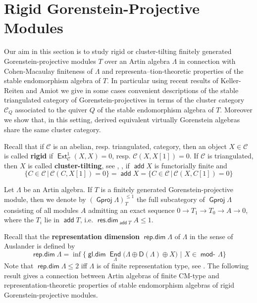 \documentclass[oneside, a4paper,reqno]{amsart}
\numberwithin{equation}{section}
\theoremstyle{definition}
\begin{document}
\section{Rigid Gorenstein-Projective Modules}
Our aim in this section is to study  rigid or cluster-tilting
finitely generated Gorenstein-projective modules $T$ over an Artin
algebra $\Lambda$ in connection with Cohen-Macaulay finiteness of
$\Lambda$ and representa--tion-theoretic properties of the stable
endomorphism algebra of $T$. In particular using recent results of
Keller-Reiten and Amiot we give in some cases convenient
descriptions of the stable triangulated category of Gorenstein-projectives in terms of the cluster category ${\mathscr C}_{Q}$ associated to
the quiver $Q$ of the stable endomorphism algebra of $T$. Moreover
we show that, in this setting, derived equivalent virtually
Gorenstein algebras share the same cluster category.

Recall that if ${\mathscr C}$ is an abelian, resp. triangulated, category,
then an object $X \in {\mathscr C}$ is called {\bf rigid} if
$\operatorname*{\mathsf{Ext}}^{1}_{\mathscr C}(X,X) = 0$, resp. ${\mathscr C}(X,X[1]) = 0$. If ${\mathscr C}$ is
triangulated, then $X$ is called {\bf cluster-tilting}, see
\cite{KR}, \cite{Iyama}, if $\operatorname*{\mathsf{add}} X$ is functorially finite and 
\[
\big\{C
\in {\mathscr C}\, | \, {\mathscr C}(C,X[1]) = 0\big\} = \operatorname*{\mathsf{add}} X =  \big\{C \in {\mathscr C} \,  | \,
{\mathscr C}(X,C[1]) = 0 \big\}
\]

Let $\Lambda$ be an Artin algebra. If $T$ is a finitely generated Gorenstein-projective module, then we denote by $({\operatorname{\mathsf{Gproj}}\nolimits}\Lambda)^{\leq 1}_{T}$ the full subcategory of ${\operatorname{\mathsf{Gproj}}\nolimits}\Lambda$ consisting of all modules $A$  admitting an exact sequence $0 {\longrightarrow} T_{1} {\longrightarrow} T_{0}{\longrightarrow} A {\longrightarrow} 0$, where the $T_{i}$ lie in $\operatorname*{\mathsf{add}} T$, i.e.
$\operatorname*{\mathsf{res.dim}}_{\operatorname*{\mathsf{add}} T}A \leq 1$.

Recall that the {\bf
representation dimension} $\operatorname*{\mathsf{rep.dim}}\Lambda$ of $\Lambda$
in the sense of Auslander \cite{Auslander:queen} is defined by
\[
\operatorname*{\mathsf{rep.dim}}\Lambda =
\inf\big\{\operatorname*{\mathsf{gl.dim}}\operatorname*{\mathsf{End}}_{\Lambda}\big(\Lambda\oplus\mathsf{D}(\Lambda)\oplus
X\big) \,\, | \,\, X \in \operatorname*{\mathsf{mod}-\!}\Lambda\big\}
\]
Note that
$\operatorname*{\mathsf{rep.dim}}\Lambda \leq 2$ iff $\Lambda$ is of finite representation type, see \cite{Auslander:queen}.  The following result gives a connection between Artin algebras of
finite CM-type and representation-theoretic properties of stable
endomorphism algebras of rigid Gorenstein-projective modules.
\end{document}
